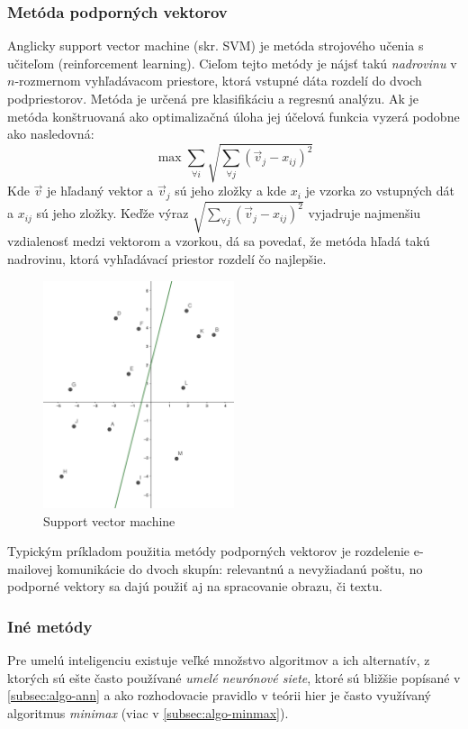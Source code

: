 \subsubsection{Metóda podporných vektorov}

Anglicky support vector machine (skr. SVM) je metóda strojového učenia s učiteľom (reinforcement learning).
Cieľom tejto metódy je nájsť takú \emph{nadrovinu} v $n$-rozmernom vyhľadávacom priestore, ktorá vstupné dáta rozdelí
do dvoch podpriestorov.
Metóda je určená pre klasifikáciu a regresnú analýzu.
Ak je metóda konštruovaná ako optimalizačná úloha jej účelová funkcia vyzerá podobne ako nasledovná:
\begin{equation}
    \max \sum_{\forall i}{\sqrt{\sum_{\forall j}{(\vec{v}_j - x_{ij})^2}}}
\end{equation}
Kde $\vec{v}$ je hľadaný vektor a $\vec{v}_j$ sú jeho zložky a kde $x_i$ je vzorka zo vstupných dát a $x_{ij}$ sú jeho
zložky.
Keďže výraz $\sqrt{\sum_{\forall j}{(\vec{v}_j - x_{ij})^2}}$ vyjadruje najmenšiu vzdialenosť medzi vektorom a
vzorkou, dá sa povedať, že metóda hľadá takú nadrovinu, ktorá vyhľadávací priestor rozdelí čo najlepšie.
\begin{figure}[H]
    \centering
    \includegraphics[width=0.5\textwidth]{images/svm.png}
    \caption{Support vector machine}
\end{figure}\label{figure:svm}

Typickým príkladom použitia metódy podporných vektorov je rozdelenie e-mailovej komunikácie do dvoch skupín: relevantnú
a nevyžiadanú poštu, no podporné vektory sa dajú použiť aj na spracovanie obrazu, či textu.

\subsubsection{Iné metódy}

Pre umelú inteligenciu existuje veľké množstvo algoritmov a ich alternatív, z ktorých sú ešte často používané
\emph{umelé neurónové siete}, ktoré sú bližšie popísané v \autoref{subsec:algo-ann} a ako rozhodovacie pravidlo v
teórii hier je často využívaný algoritmus \emph{minimax} (viac v \autoref{subsec:algo-minmax}).
